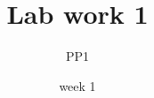 \documentclass[12pt]{article}%
\begin{document}
    \title{Lab work 1}
    \date{week 1}
    \author{PP1}
    \maketitle
    
    
    
    
    
\end{document}
